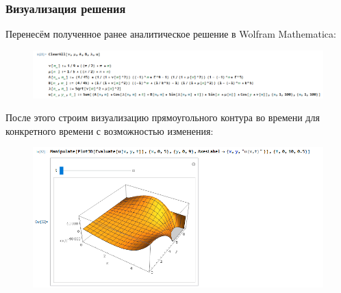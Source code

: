 \documentclass[11pt]{article}
\begin{document}
\subsubsection*{Визуализация решения}
Перенесём полученное ранее аналитическое решение в Wolfram Mathematica:
\begin{figure}
    \centering
    \includegraphics[width=1\linewidth]{image4.png}
\end{figure}
После этого строим визуализацию прямоугольного контура во времени для конкретного
времени с возможностью изменения:
\begin{figure}
    \centering
    \includegraphics[width=1\linewidth]{image5.png}
\end{figure}
\end{document}
